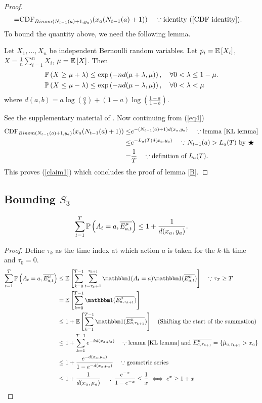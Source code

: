 \documentclass[11pt]{article}
\begin{document}
\begin{proof}
\begin{align}
=&\mathrm{CDF}_{Binom(N_{t-1}(a)+1,y_a)}(x_a(N_{t-1}(a)+1)) \quad \because \mbox{identity (\ref{CDF identity}).}\label{eq4}\end{align}
To bound the quantity above, we need the following lemma.
\begin{lemma}\label{KL lemma}
Let $X_1,\dots, X_n$ be independent Bernoulli random variables. Let $p_i = \mathbb{E}\left[ X_i \right]$, $X=\frac{1}{n} \sum_{i=1}^n X_i$, $\mu = \mathbb{E}\left[ X \right]$. Then
\begin{align*}&\mathbb{P}\left( X\ge \mu+\lambda \right) \le \exp\left(-nd(\mu+\lambda,\mu)\right),\quad \forall 0 < \lambda \le 1-\mu.\\
&\mathbb{P}\left( X \le \mu-\lambda \right) \le \exp\left(-nd(\mu-\lambda,\mu)\right), \quad \forall 0 < \lambda < \mu
\end{align*}
where $d(a,b) = a \log(\frac{a}{b})+(1-a)\log(\frac{1-a}{1-b})$.
\end{lemma}


See the supplementary material of \cite{agrawal2013further}. Now continuing from (\ref{eq4})
\begin{align*}\mathrm{CDF}_{Binom(N_{t-1}(a)+1,y_a)}(x_a(N_{t-1}(a)+1)) \le &e^{-(N_{t-1}(a)+1)d(x_a,y_a)} \quad \because \mbox{lemma \ref{KL lemma}}\\
\le &e^{-L_a(T)d(x_a,y_a)} \quad \because \mbox{$N_{t-1}(a) > L_a(T)$ by $\bigstar$} \\
= &\frac{1}{T} \quad \because \mbox{definition of $L_a(T)$.}\end{align*}
This proves (\ref{claim1}) which concludes the proof of lemma \ref{B}.
\end{proof}

\subsection{Bounding $S_3$}
\begin{lemma}\label{C}
$$\sum_{t=1}^T  \mathbb{P}\left( A_t = a, \overline{E^{\mu}_{a,t}} \right)\le 1 + \frac{1}{d(x_a,y_a)}.$$
\end{lemma}
\begin{proof}
Define $\tau_k$ as the time index at which action $a$ is taken for the $k$-th time and $\tau_0 = 0$.
\begin{align*}
\sum_{t=1}^T  \prob{A_t = a, \overline{E^{\mu}_{a,t}}} &\le \E{\sum_{k=0}^{T-1} \sum_{t= \tau_k +1}^{\tau_{k+1}} \ind(A_t =a) \ind(\overline{E^\mu_{a,t}})} \quad \because \tau_{T} \ge T\\
 &= \E{\sum_{k=0}^{T-1}\ind(\overline{E^\mu_{a,\tau_{k+1}}})}\\
 &\le 1+\E{\sum_{k=1}^{T-1}\ind(\overline{E^\mu_{a,\tau_{k+1}}})}\quad \mbox{(Shifting the start of the summation)}\\
  &\le 1+\sum_{k=1}^{T-1} e^{-kd(x_a,\mu_a)} \quad \because \mbox{lemma \ref{KL lemma} and } \overline{E^\mu_{a,\tau_{k+1}}}= \{\hat{\mu}_{a,\tau_{k+1}} > x_a \}\\
  &\le 1+\frac{e^{-d(x_a,\mu_a)}}{1-e^{-d(x_a,\mu_a)} }\quad \because \mbox{geometric series}\\
  &\le 1+\frac{1}{d(x_a,\mu_a)}\quad \because \frac{e^{-x}}{1-e^{-x}} \le \frac{1}{x} \iff e^x \ge 1 + x
\end{align*}
\end{proof}
\end{document}
